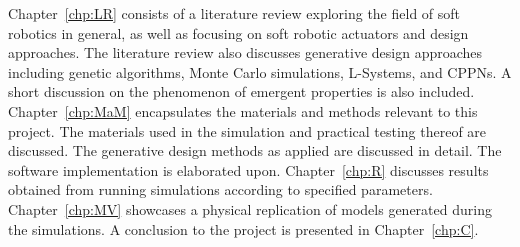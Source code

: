 Chapter~\ref{chp:LR} consists of a literature review exploring the field of soft robotics in general, as well as focusing on soft robotic actuators and design approaches. The literature review also discusses generative design approaches including genetic algorithms, Monte Carlo simulations, L-Systems, and CPPNs. A short discussion on the phenomenon of emergent properties is also included. Chapter~\ref{chp:MaM} encapsulates the materials and methods relevant to this project. The materials used in the simulation and practical testing thereof are discussed. The generative design methods as applied are discussed in detail. The software implementation is elaborated upon. Chapter~\ref{chp:R} discusses results obtained from running simulations according to specified parameters. Chapter~\ref{chp:MV} showcases a physical replication of models generated during the simulations. A conclusion to the project is presented in Chapter~\ref{chp:C}.